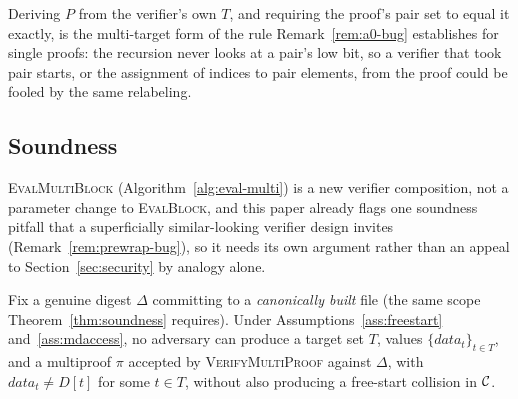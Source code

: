 Deriving $P$ from the verifier's own $T$, and requiring the proof's pair
set to equal it exactly, is the multi-target form of the rule
Remark~\ref{rem:a0-bug} establishes for single proofs: the recursion never
looks at a pair's low bit, so a verifier that took pair starts, or the
assignment of indices to pair elements, from the proof could be fooled by
the same relabeling.

\subsection{Soundness}
\label{sec:multiproof-soundness}

\textsc{EvalMultiBlock} (Algorithm~\ref{alg:eval-multi}) is a new
verifier composition, not a parameter change to \textsc{EvalBlock}, and
this paper already flags one soundness pitfall that a superficially
similar-looking verifier design invites (Remark~\ref{rem:prewrap-bug}), so
it needs its own argument rather than an appeal to
Section~\ref{sec:security} by analogy alone.

\begin{lemma}
\label{lem:multiproof-soundness}
Fix a genuine digest $\Delta$ committing to a \emph{canonically built} file
(the same scope Theorem~\ref{thm:soundness} requires). Under
Assumptions~\ref{ass:freestart} and~\ref{ass:mdaccess}, no adversary can
produce a target set $T$, values $\{\mathit{data}_t\}_{t \in T}$, and a
multiproof $\pi$ accepted by \textsc{VerifyMultiProof} against $\Delta$,
with $\mathit{data}_t \ne D[t]$ for some $t \in T$, without also producing
a free-start collision in $\mathcal{C}$.
\end{lemma}

